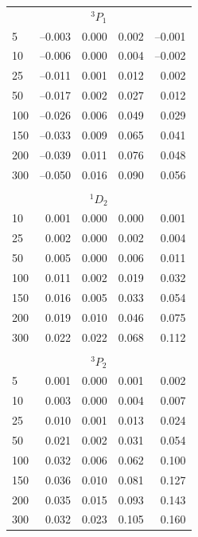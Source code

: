 \begin{table}
\begin{tabular}{lrrrr}
\\ \multicolumn{5}{c}{$^3P_1$} \\                                               
    5 & --0.003 &   0.000 &   0.002 & --0.001 \\
   10 & --0.006 &   0.000 &   0.004 & --0.002 \\
   25 & --0.011 &   0.001 &   0.012 &   0.002 \\
   50 & --0.017 &   0.002 &   0.027 &   0.012 \\
  100 & --0.026 &   0.006 &   0.049 &   0.029 \\
  150 & --0.033 &   0.009 &   0.065 &   0.041 \\
  200 & --0.039 &   0.011 &   0.076 &   0.048 \\
  300 & --0.050 &   0.016 &   0.090 &   0.056 \\
\hline                                                                          
\\ \multicolumn{5}{c}{$^1D_2$} \\                                               
   10 &   0.001 &   0.000 &   0.000 &   0.001 \\
   25 &   0.002 &   0.000 &   0.002 &   0.004 \\
   50 &   0.005 &   0.000 &   0.006 &   0.011 \\
  100 &   0.011 &   0.002 &   0.019 &   0.032 \\
  150 &   0.016 &   0.005 &   0.033 &   0.054 \\
  200 &   0.019 &   0.010 &   0.046 &   0.075 \\
  300 &   0.022 &   0.022 &   0.068 &   0.112 \\
\hline                                                                          
\\ \multicolumn{5}{c}{$^3P_2$} \\                                               
    5 &   0.001 &   0.000 &   0.001 &   0.002 \\
   10 &   0.003 &   0.000 &   0.004 &   0.007 \\
   25 &   0.010 &   0.001 &   0.013 &   0.024 \\
   50 &   0.021 &   0.002 &   0.031 &   0.054 \\
  100 &   0.032 &   0.006 &   0.062 &   0.100 \\
  150 &   0.036 &   0.010 &   0.081 &   0.127 \\
  200 &   0.035 &   0.015 &   0.093 &   0.143 \\
  300 &   0.032 &   0.023 &   0.105 &   0.160 \\
\end{tabular}
\label{tab_CSB}
\end{table}



